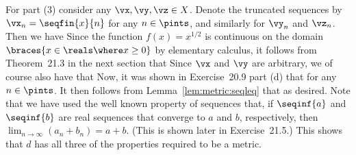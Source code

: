 {{    For part (3) consider any $\vx,\vy,\vz \in X$.
    Denote the truncated sequences by $\vx_n = \seqfin{x}{n}$ for any $n \in \pints$, and similarly for $\vy_n$ and $\vz_n$.
    Then we have
    Since the function $f(x) = x^{1/2}$ is continuous on the domain $\braces{x \in \reals \where x \geq 0}$ by elementary calculus, it follows from Theorem~21.3 in the next section that
    Since $\vx$ and $\vy$ are arbitrary, we of course also have that
    Now, it was shown in Exercise~20.9 part (d) that
    for any $n \in \pints$.
    It then follows from Lemma~\ref{lem:metric:seqleq} that
    as desired.
    Note that we have used the well known property of sequences that, if $\seqinf{a}$ and $\seqinf{b}$ are real sequences that converge to $a$ and $b$, respectively, then $\lim_{n \to \infty} (a_n + b_n) = a + b$. (This is shown later in Exercise~21.5.)
    This shows that $d$ has all three of the properties required to be a metric.
  }
}

